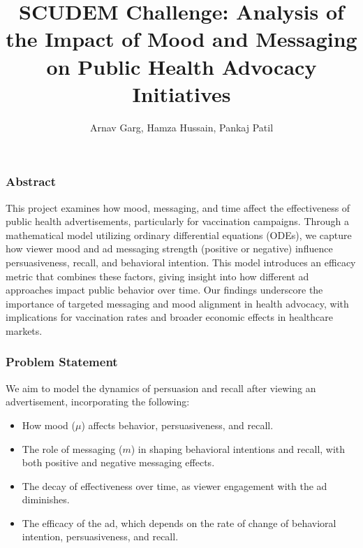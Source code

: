 \documentclass[12pt]{beamer}
\title{\textbf{SCUDEM Challenge: Analysis of the Impact of Mood and Messaging on Public Health Advocacy Initiatives}}
\author{Arnav Garg, Hamza Hussain, Pankaj Patil}
\begin{document}
\maketitle

\begin{frame}
\frametitle{Abstract}
This project examines how mood, messaging, and time affect the effectiveness of public health advertisements, particularly for vaccination campaigns. Through a mathematical model utilizing ordinary differential equations (ODEs), we capture how viewer mood and ad messaging strength (positive or negative) influence persuasiveness, recall, and behavioral intention. This model introduces an efficacy metric that combines these factors, giving insight into how different ad approaches impact public behavior over time. Our findings underscore the importance of targeted messaging and mood alignment in health advocacy, with implications for vaccination rates and broader economic effects in healthcare markets.
\end{frame}


\begin{frame}
\frametitle{Problem Statement}
We aim to model the dynamics of persuasion and recall after viewing an advertisement, incorporating the following:
\begin{itemize}
    \item How mood (\( \mu \)) affects behavior, persuasiveness, and recall.
    \item The role of messaging (\( m \)) in shaping behavioral intentions and recall, with both positive and negative messaging effects.
    \item The decay of effectiveness over time, as viewer engagement with the ad diminishes.
    \item The efficacy of the ad, which depends on the rate of change of behavioral intention, persuasiveness, and recall.
\end{itemize}
\end{frame}
\end{document}
